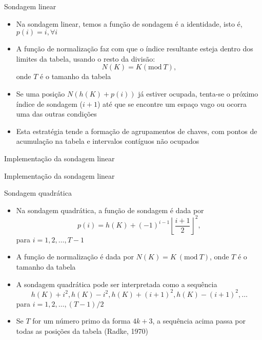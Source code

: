 \begin{frame}{Sondagem linear} 

	\begin{itemize}
		\item Na sondagem linear, temos a função de sondagem é a identidade, isto é,
            $p(i) = i, \forall i$

        \item A função de normalização faz com que o índice resultante esteja dentro dos 
            limites da tabela, usando o resto da divisão:
            \[
                N(K) = K (\mbox{mod}\ T), \]
            onde $T$ é o tamanho da tabela

		\item Se uma posição $N(h(K) + p(i))$ já estiver ocupada, tenta-se o próximo índice de 
            sondagem ($i + 1$) até que se encontre um espaço vago ou ocorra uma das outras 
            condições

		\item Esta estratégia tende a formação de agrupamentos de chaves, com pontos de 
            acumulação na tabela e intervalos contíguos não ocupados
	\end{itemize}

\end{frame}



\begin{frame}[fragile]{Implementação da sondagem linear}
\end{frame}

\begin{frame}[fragile]{Implementação da sondagem linear}
\end{frame}

\begin{frame}{Sondagem quadrática} 

	\begin{itemize}
		\item Na sondagem quadrática, a função de sondagem é dada por
		\[
            p(i) = h(K) + (-1)^{i-1}\left\lfloor\frac{i+1}{2}\right\rfloor^2,
        \]
		para $i = 1, 2, \ldots, T - 1$

        \item A função de normalização é dada por $N(K) = K\ (\mbox{mod}\ T)$, onde $T$ é o 
            tamanho da tabela

		\item A sondagem quadrática pode ser interpretada como a sequência 
        \[
            h(K) + i^2, h(K) - i^2, h(K) + (i + 1)^2, h(K) - (i + 1)^2, \ldots
        \]
        para $i = 1, 2, \ldots, (T - 1)/2$ 

		\item Se $T$ for um número primo da forma $4k+3$, a sequência acima passa por todas 
            as posições da tabela (Radke, 1970)
	\end{itemize}

\end{frame}

